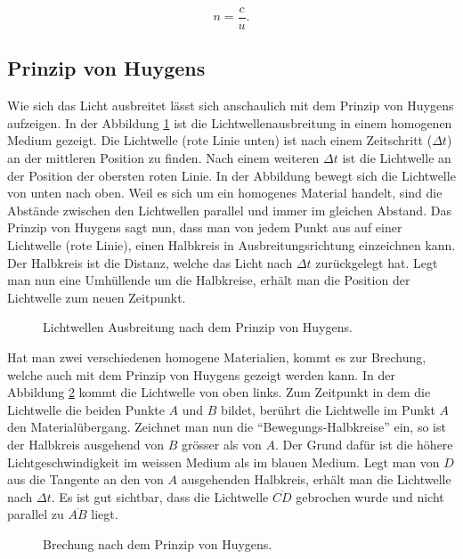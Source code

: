 \begin{refsection}
\begin{equation}
  n = \frac{c}{u}.
\end{equation}


\subsection{Prinzip von Huygens}
%
%
Wie sich das Licht ausbreitet lässt sich anschaulich mit dem Prinzip
von Huygens aufzeigen.  In der Abbildung \ref{fig:huygens1} ist die
Lichtwellenausbreitung in einem homogenen Medium gezeigt.  Die
Lichtwelle (rote Linie unten) ist nach einem Zeitschritt
(\(\Delta t\)) an der mittleren Position zu finden.  Nach einem
weiteren \(\Delta t\) ist die Lichtwelle an der Position der obersten
roten Linie.  In der Abbildung bewegt sich die Lichtwelle von unten
nach oben.  Weil es sich um ein homogenes Material handelt, sind die
Abstände zwischen den Lichtwellen parallel und immer im gleichen
Abstand.  Das Prinzip von Huygens sagt nun, dass man von jedem Punkt
aus auf einer Lichtwelle (rote Linie), einen Halbkreis in
Ausbreitungsrichtung einzeichnen kann.  Der Halbkreis ist die Distanz,
welche das Licht nach \(\Delta t\) zurückgelegt hat.  Legt man nun
eine Umhüllende um die Halbkreise, erhält man die Position der
Lichtwelle zum neuen Zeitpunkt.

\begin{figure}
  \centering
  
  \caption{Lichtwellen Ausbreitung nach dem Prinzip von Huygens.}
  \label{fig:huygens1}
\end{figure}

Hat man zwei verschiedenen homogene Materialien, kommt es zur
Brechung, welche auch mit dem Prinzip von Huygens gezeigt werden kann.
In der Abbildung \ref{fig:huygens2} kommt die Lichtwelle von oben
links.  Zum Zeitpunkt in dem die Lichtwelle die beiden Punkte \(A\)
und \(B\) bildet, berührt die Lichtwelle im Punkt \(A\) den
Materialübergang.  Zeichnet man nun die ``Bewegungs-Halbkreise'' ein,
so ist der Halbkreis ausgehend von \(B\) grösser als von \(A\).  Der
Grund dafür ist die höhere Lichtgeschwindigkeit im weissen Medium als
im blauen Medium.  Legt man von \(D\) aus die Tangente an den von
\(A\) ausgehenden Halbkreis, erhält man die Lichtwelle nach
\(\Delta t\).  Es ist gut sichtbar, dass die Lichtwelle
\(\overline{CD}\) gebrochen wurde und nicht parallel zu
\(\overline{AB}\) liegt.

\begin{figure}
  \centering
  
  \caption{Brechung nach dem Prinzip von Huygens.}
  \label{fig:huygens2}
\end{figure}


\end{refsection}
